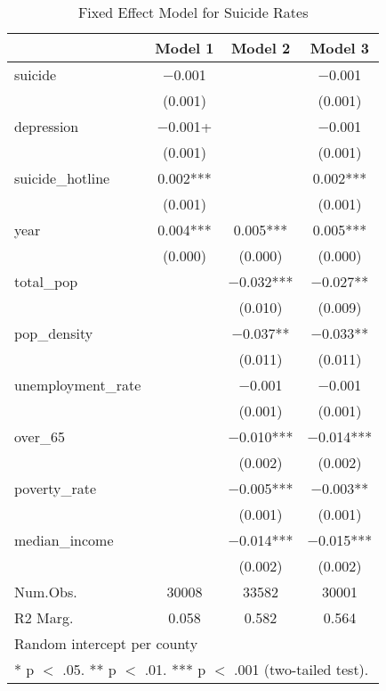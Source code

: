 \begin{table}[!h]

\caption{\label{tab:suicide_analysis}Fixed Effect Model for Suicide Rates}
\centering
\fontsize{8}{10}\selectfont

\begin{tabular}{lccc}
\toprule
  & Model 1 & Model 2 & Model 3\\
\midrule

suicide & \num{-0.001} &  & \num{-0.001}\\
 & (\num{0.001}) &  & \vphantom{2} (\num{0.001})\\
depression & \num{-0.001}+ &  & \num{-0.001}\\
 & (\num{0.001}) &  & \vphantom{1} (\num{0.001})\\
suicide\_hotline & \num{0.002}*** &  & \num{0.002}***\\
 & (\num{0.001}) &  & (\num{0.001})\\
year & \num{0.004}*** & \num{0.005}*** & \num{0.005}***\\
 & (\num{0.000}) & (\num{0.000}) & (\num{0.000})\\
total\_pop &  & \num{-0.032}*** & \num{-0.027}**\\
 &  & (\num{0.010}) & (\num{0.009})\\
pop\_density &  & \num{-0.037}** & \num{-0.033}**\\
 &  & (\num{0.011}) & (\num{0.011})\\
unemployment\_rate &  & \num{-0.001} & \num{-0.001}\\
 &  & (\num{0.001}) & \vphantom{1} (\num{0.001})\\
over\_65 &  & \num{-0.010}*** & \num{-0.014}***\\
 &  & (\num{0.002}) & \vphantom{1} (\num{0.002})\\
poverty\_rate &  & \num{-0.005}*** & \num{-0.003}**\\
 &  & (\num{0.001}) & (\num{0.001})\\
median\_income &  & \num{-0.014}*** & \num{-0.015}***\\
 &  & (\num{0.002}) & (\num{0.002})\\
\midrule
Num.Obs. & \num{30008} & \num{33582} & \num{30001}\\
R2 Marg. & \num{0.058} & \num{0.582} & \num{0.564}\\
\bottomrule
\multicolumn{4}{l}{\rule{0pt}{1em}Random intercept per county}\\
\multicolumn{4}{l}{\rule{0pt}{1em}* p $<$ .05. ** p $<$ .01. *** p $<$ .001 (two-tailed test).}\\
\end{tabular}
\end{table}